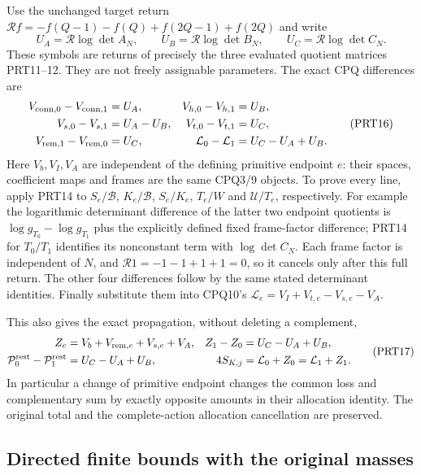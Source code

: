 Use the unchanged target return
$\mathcal Rf=-f(Q-1)-f(Q)+f(2Q-1)+f(2Q)$ and write
\[
 U_A=\mathcal R\log\det A_N,\qquad
 U_B=\mathcal R\log\det B_N,\qquad
 U_C=\mathcal R\log\det C_N.
 \tag{PRT15}
\]
These symbols are returns of precisely the three evaluated quotient
matrices PRT11--12. They are not freely assignable parameters.
The exact CPQ differences are
\[
 \begin{aligned}
 V_{{\rm conn},0}-V_{{\rm conn},1}&=U_A,&
 V_{h,0}-V_{h,1}&=U_B,\\
 V_{s,0}-V_{s,1}&=U_A-U_B,&
 V_{t,0}-V_{t,1}&=U_C,\\
 V_{{\rm rem},1}-V_{{\rm rem},0}&=U_C,&
 \mathcal L_0-\mathcal L_1&=U_C-U_A+U_B.
 \end{aligned}\tag{PRT16}
\]
Here $V_b,V_I,V_A$ are independent of the defining primitive endpoint
$e$: their spaces, coefficient maps and frames are the same CPQ3/9
objects. To prove every line, apply PRT14 to
$S_e/\mathscr B$, $K_e/\mathscr B$, $S_e/K_e$, $T_e/W$ and
$\mathcal U/T_e$, respectively. For example the logarithmic
determinant difference of the latter two endpoint quotients is
$\log g_{T_0}-\log g_{T_1}$ plus the explicitly defined fixed
frame-factor difference; PRT14 for $T_0/T_1$ identifies its
nonconstant term with $\log\det C_N$.
Each frame factor is independent of $N$, and
$\mathcal R1=-1-1+1+1=0$, so it cancels only after this full return.
The other four differences follow by the same stated determinant
identities. Finally substitute them into CPQ10's
$\mathcal L_e=V_I+V_{t,e}-V_{s,e}-V_A$.

This also gives the exact propagation, without deleting a complement,
\[
 \begin{aligned}
 Z_e&=V_b+V_{{\rm rem},e}+V_{s,e}+V_A,
 &Z_1-Z_0&=U_C-U_A+U_B,\\
 \mathcal P^{\rm rest}_0-\mathcal P^{\rm rest}_1
    &=U_C-U_A+U_B,
 &4S_{K,j}&=\mathcal L_0+Z_0=\mathcal L_1+Z_1.
 \end{aligned}\tag{PRT17}
\]
In particular a change of primitive endpoint changes the common loss
and complementary sum by exactly opposite amounts in their allocation
identity. The original total and the complete-action allocation
cancellation are preserved.

\subsection{Directed finite bounds with the original masses}

